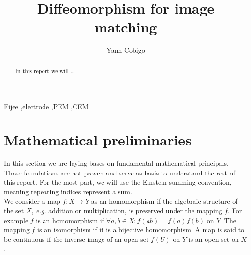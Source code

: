 \documentclass[final, paper=letter,5p,times,twocolumn]{elsarticle}
\theoremstyle{definition}
\begin{document}
\begin{frontmatter}

\title{Diffeomorphism for image matching}

\author[label1]{Yann Cobigo}
\address[label1]{University of California, San Francisco | ucsf.edu}




\begin{abstract}
In this report we will \dots
\end{abstract}

\begin{keyword}
Fijee \sep electrode \sep PEM \sep CEM
\end{keyword}

\end{frontmatter}


\section{Mathematical preliminaries}

In this section we are laying bases on fundamental mathematical principals. Those foundations are not proven and serve as basis to understand the rest of this report. For the most part, we will use the Einstein summing convention, meaning repeating indices represent a sum.\\
We consider a map $f: X \rightarrow Y$ as an homomorphism if the algebraic structure of the set $X$, {\it e.g.} addition or multiplication, is preserved under the mapping $f$. For example $f$ is an homomorphism if $\forall a,b \in X: f(ab) = f(a)f(b)$ on $Y$. The mapping $f$ is an isomorphism if it is a bijective homomorphism. A map is said to be continuous if the inverse image of an open set $f(U)$ on $Y$ is an open set on $X$.
\end{document}
